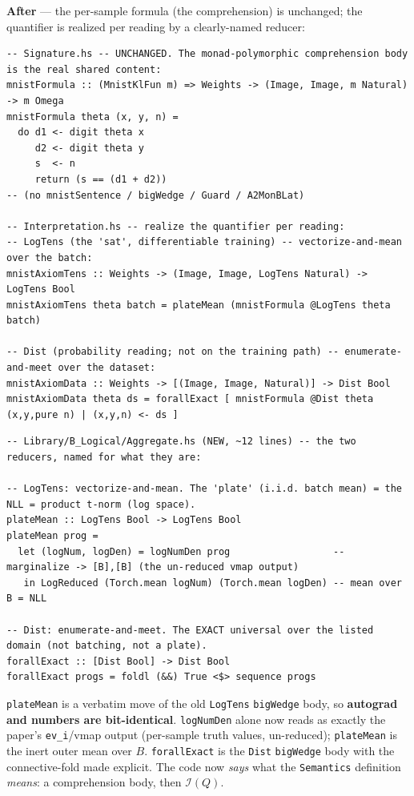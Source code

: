 \documentclass[11pt]{article}
\newcommand{\code}[1]{\texttt{#1}}
\newcommand{\Int}{\mathcal I}
\begin{document}
\textbf{After} --- the per-sample formula (the comprehension) is unchanged; the quantifier is realized per
reading by a clearly-named reducer:

\begin{lstlisting}
-- Signature.hs -- UNCHANGED. The monad-polymorphic comprehension body is the real shared content:
mnistFormula :: (MnistKlFun m) => Weights -> (Image, Image, m Natural) -> m Omega
mnistFormula theta (x, y, n) =
  do d1 <- digit theta x
     d2 <- digit theta y
     s  <- n
     return (s == (d1 + d2))
-- (no mnistSentence / bigWedge / Guard / A2MonBLat)

-- Interpretation.hs -- realize the quantifier per reading:
-- LogTens (the 'sat', differentiable training) -- vectorize-and-mean over the batch:
mnistAxiomTens :: Weights -> (Image, Image, LogTens Natural) -> LogTens Bool
mnistAxiomTens theta batch = plateMean (mnistFormula @LogTens theta batch)

-- Dist (probability reading; not on the training path) -- enumerate-and-meet over the dataset:
mnistAxiomData :: Weights -> [(Image, Image, Natural)] -> Dist Bool
mnistAxiomData theta ds = forallExact [ mnistFormula @Dist theta (x,y,pure n) | (x,y,n) <- ds ]
\end{lstlisting}

\begin{lstlisting}
-- Library/B_Logical/Aggregate.hs (NEW, ~12 lines) -- the two reducers, named for what they are:

-- LogTens: vectorize-and-mean. The 'plate' (i.i.d. batch mean) = the NLL = product t-norm (log space).
plateMean :: LogTens Bool -> LogTens Bool
plateMean prog =
  let (logNum, logDen) = logNumDen prog                  -- marginalize -> [B],[B] (the un-reduced vmap output)
   in LogReduced (Torch.mean logNum) (Torch.mean logDen) -- mean over B = NLL

-- Dist: enumerate-and-meet. The EXACT universal over the listed domain (not batching, not a plate).
forallExact :: [Dist Bool] -> Dist Bool
forallExact progs = foldl (&&) True <$> sequence progs
\end{lstlisting}

\code{plateMean} is a verbatim move of the old \code{LogTens} \code{bigWedge} body, so \textbf{autograd and
numbers are bit-identical}. \code{logNumDen} alone now reads as exactly the paper's \code{ev\_i}/vmap output
(per-sample truth values, un-reduced); \code{plateMean} is the inert outer mean over $B$. \code{forallExact}
is the \code{Dist} \code{bigWedge} body with the connective-fold made explicit. The code now \emph{says}
what the \code{Semantics} definition \emph{means}: a comprehension body, then $\Int(Q)$.
\end{document}

